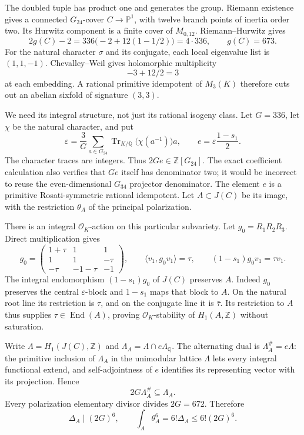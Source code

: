 The doubled tuple has product one and generates the group.  Riemann
existence gives a connected \(G_{24}\)-cover \(C\to\mathbb P^1\), with
twelve branch points of inertia order two.  Its Hurwitz component is a
finite cover of \(M_{0,12}\).  Riemann--Hurwitz gives
\[
 2g(C)-2=336\bigl(-2+12(1-1/2)\bigr)=4\cdot336,
 \qquad g(C)=673.
\]
For the natural character \(\sigma\) and its conjugate, each local
eigenvalue list is \((1,1,-1)\).  Chevalley--Weil
\cite[Theorem 2.10]{G34:FGP} gives holomorphic multiplicity
\[
                         -3+12/2=3
\]
at each embedding.  A rational primitive idempotent of \(M_3(K)\) therefore
cuts out an abelian sixfold of signature \((3,3)\).

We need its integral structure, not just its rational isogeny class.  Let
\(G=336\), let \(\chi\) be the natural character, and put
\[
 \varepsilon=\frac3G\sum_{a\in G_{24}}
       \operatorname{Tr}_{K/\mathbb Q}\bigl(\chi(a^{-1})\bigr)a,
 \qquad e=\varepsilon\frac{1-s_1}{2}.
\]
The character traces are integers.  Thus \(2Ge\in\mathbb Z[G_{24}]\).
The exact coefficient calculation also verifies that \(Ge\) itself has
denominator two; it would be incorrect to reuse the even-dimensional
\(G_{34}\) projector denominator.  The element \(e\) is a primitive
Rosati-symmetric rational idempotent.  Let \(A\subset J(C)\) be its image,
with the restriction \(\theta_A\) of the principal polarization.

There is an integral \(\mathcal O_K\)-action on this particular subvariety.
Let \(g_0=R_1R_2R_3\).  Direct multiplication gives
\[
 g_0=\begin{pmatrix}
 1+\tau&1&1\\1&1&-\tau\\-\tau&-1-\tau&-1
 \end{pmatrix},\qquad
 \langle v_1,g_0v_1\rangle=\tau,
 \qquad (1-s_1)g_0v_1=\tau v_1.
\]
The integral endomorphism \((1-s_1)g_0\) of \(J(C)\) preserves \(A\).
Indeed \(g_0\) preserves the central \(\varepsilon\)-block and \(1-s_1\)
maps that block to \(A\).  On the natural root line its restriction is
\(\tau\), and on the conjugate line it is \(\bar\tau\).  Its restriction
to \(A\) thus supplies \(\tau\in\operatorname{End}(A)\), proving
\(\mathcal O_K\)-stability of \(H_1(A,\mathbb Z)\) without saturation.

Write \(\Lambda=H_1(J(C),\mathbb Z)\) and
\(\Lambda_A=\Lambda\cap e\Lambda_{\mathbb Q}\).  The alternating
dual is \(\Lambda_A^\#=e\Lambda\): the primitive inclusion of
\(\Lambda_A\) in the unimodular lattice \(\Lambda\) lets every integral
functional extend, and self-adjointness of \(e\) identifies its representing
vector with its projection.  Hence
\[
 2G\Lambda_A^\#\subseteq\Lambda_A.
\]
Every polarization elementary divisor divides \(2G=672\).  Therefore
\begin{equation}\label{eq:g24-source-delta}
 \Delta_A\mid(2G)^6,
 \qquad \int_A\theta_A^6=6!\Delta_A\le6!(2G)^6.
\end{equation}

